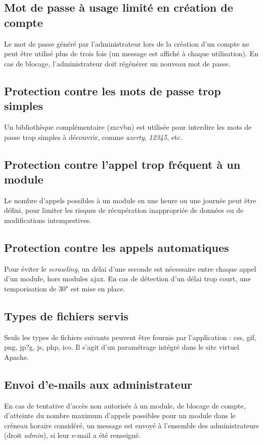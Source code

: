 \subsection{Mot de passe à usage limité en création de compte}
Le mot de passe généré par l'administrateur lors de la création d'un compte ne peut être utilisé plus de trois fois (un message est affiché à chaque utilisation). En cas de blocage, l'administrateur doit régénérer un nouveau mot de passe.

\subsection{Protection contre les mots de passe trop simples}
Un bibliothèque complémentaire (zxcvbn) est utilisée pour interdire les mots de passe trop simples à découvrir, comme \textit{azerty}, \textit{12345}, etc. 

\subsection{Protection contre l'appel trop fréquent à un module}
Le nombre d'appels possibles à un module en une heure ou une journée peut être défini, pour limiter les risques de récupération inappropriée de données ou de modifications intempestives.

\subsection{Protection contre les appels automatiques}
Pour éviter le \textit{scrawling}, un délai d'une seconde est nécessaire entre chaque appel d'un module, hors modules ajax. En cas de détection d'un délai trop court, une temporisation de 30" est mise en place.

\subsection{Types de fichiers servis}
Seuls les types de fichiers suivants peuvent être fournis par l'application : css, gif, png, jp?g, js, php, ico. Il s'agit d'un paramétrage intégré dans le site virtuel Apache.

\subsection{Envoi d'e-mails aux administrateur}
En cas de tentative d'accès non autorisée à un module, de blocage de compte, d'atteinte du nombre maximum d'appels possibles pour un module dans le créneau horaire considéré, un message est envoyé à l'ensemble des administrateurs (droit \textit{admin}), si leur e-mail a été renseigné.

